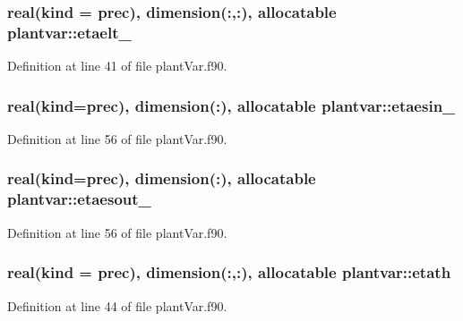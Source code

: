 \hypertarget{classplantvar_a42c8e330560c87b991b46be04c40a03d}{
\subsubsection[{etaelt\-\_\-}]{\setlength{\rightskip}{0pt plus 5cm}real(kind = prec), dimension(\-:,\-:), allocatable plantvar\-::etaelt\-\_\-}}\label{classplantvar_a42c8e330560c87b991b46be04c40a03d}


Definition at line 41 of file plant\-Var.\-f90.

\hypertarget{classplantvar_a3d6924ccf970f712f654dc0ca561b07e}{
\subsubsection[{etaesin\-\_\-}]{\setlength{\rightskip}{0pt plus 5cm}real(kind=prec), dimension(\-:), allocatable plantvar\-::etaesin\-\_\-}}\label{classplantvar_a3d6924ccf970f712f654dc0ca561b07e}


Definition at line 56 of file plant\-Var.\-f90.

\hypertarget{classplantvar_a3d1c9aec11569f63ac581bd4176c69f1}{
\subsubsection[{etaesout\-\_\-}]{\setlength{\rightskip}{0pt plus 5cm}real(kind=prec), dimension(\-:), allocatable plantvar\-::etaesout\-\_\-}}\label{classplantvar_a3d1c9aec11569f63ac581bd4176c69f1}


Definition at line 56 of file plant\-Var.\-f90.

\hypertarget{classplantvar_a226f4150db308d7f4c46da8f297127af}{
\subsubsection[{etath}]{\setlength{\rightskip}{0pt plus 5cm}real(kind = prec), dimension(\-:,\-:), allocatable plantvar\-::etath}}\label{classplantvar_a226f4150db308d7f4c46da8f297127af}


Definition at line 44 of file plant\-Var.\-f90.

